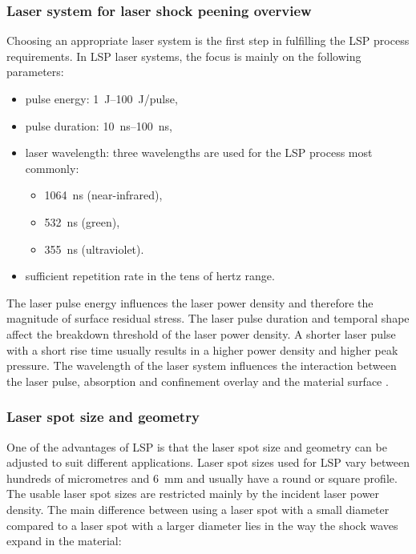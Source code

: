 \subsubsection*{Laser system for laser shock peening overview}

Choosing an appropriate laser system is the first step in fulfilling the LSP process requirements. In LSP laser systems, the focus is mainly on the following parameters:
\begin{itemize}

    \item pulse energy: \SIrange{1}{100}{\joule}/pulse,
    \item pulse duration: \SIrange{10}{100}{\nano\second},
    
    \item laser wavelength: three wavelengths are used for the LSP process most commonly:
    
    \begin{itemize}

        \item \SI{1064}{\nano\second} (near-infrared),
        \item \SI{532}{\nano\second} (green),
        \item \SI{355}{\nano\second} (ultraviolet).

    \end{itemize}
    
    \item sufficient repetition rate in the tens of hertz range.

\end{itemize}

The laser pulse energy influences the laser power density and therefore the magnitude of surface residual stress. 
The laser pulse duration and temporal shape affect the breakdown threshold of the laser power density. A shorter laser pulse with a short rise time usually results in a higher power density and higher peak pressure. 
The wavelength of the laser system influences the interaction between the laser pulse, absorption and confinement overlay and the material surface \cite{fabbro_peyre_berthe_scherpereel_1998}. 

\subsubsection*{Laser spot size and geometry}

One of the advantages of LSP is that the laser spot size and geometry can be adjusted to suit different applications. Laser spot sizes used for LSP vary between hundreds of micrometres and \SI{6}{\milli\meter} and usually have a round or square profile. The usable laser spot sizes are restricted mainly by the incident laser power density. The main difference between using a laser spot with a small diameter compared to a laser spot with a larger diameter lies in the way the shock waves expand in the material:

